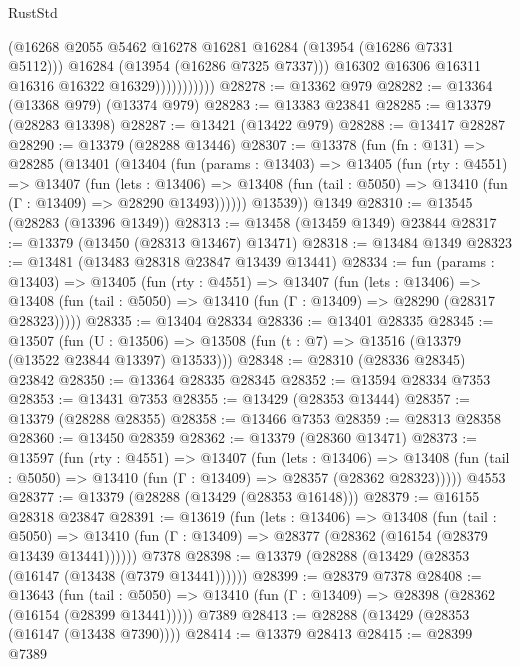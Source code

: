 \begin{lexlean}{RustStd}
\begin{coremodule}
                            (@16268 @2055 @5462 @16278 @16281 @16284 (@13954 (@16286 @7331 @5112)))
                            @16284
                            (@13954 (@16286 @7325 @7337)))
                          @16302
                          @16306
                          @16311
                          @16316
                          @16322
                          @16329)))))))))))
@28278 := @13362 @979
@28282 := @13364 (@13368 @979) (@13374 @979)
@28283 := @13383 @23841
@28285 := @13379 (@28283 @13398)
@28287 := @13421 (@13422 @979)
@28288 := @13417 @28287
@28290 := @13379 (@28288 @13446)
@28307 := @13378
    (fun (fn : @131) =>
    @28285
      (@13401
        (@13404
          (fun (params : @13403) =>
          @13405
            (fun (rty : @4551) =>
            @13407
              (fun (lets : @13406) =>
              @13408 (fun (tail : @5050) => @13410 (fun (Γ : @13409) => @28290 @13493))))))
        @13539))
    @1349
@28310 := @13545 (@28283 (@13396 @1349))
@28313 := @13458 (@13459 @1349) @23844
@28317 := @13379 (@13450 (@28313 @13467) @13471)
@28318 := @13484 @1349
@28323 := @13481 (@13483 @28318 @23847 @13439 @13441)
@28334 := fun (params : @13403) =>
  @13405
    (fun (rty : @4551) =>
    @13407
      (fun (lets : @13406) =>
      @13408 (fun (tail : @5050) => @13410 (fun (Γ : @13409) => @28290 (@28317 @28323)))))
@28335 := @13404 @28334
@28336 := @13401 @28335
@28345 := @13507
    (fun (U : @13506) => @13508 (fun (t : @7) => @13516 (@13379 (@13522 @23844 @13397) @13533)))
@28348 := @28310 (@28336 @28345) @23842
@28350 := @13364 @28335 @28345
@28352 := @13594 @28334 @7353
@28353 := @13431 @7353
@28355 := @13429 (@28353 @13444)
@28357 := @13379 (@28288 @28355)
@28358 := @13466 @7353
@28359 := @28313 @28358
@28360 := @13450 @28359
@28362 := @13379 (@28360 @13471)
@28373 := @13597
    (fun (rty : @4551) =>
    @13407
      (fun (lets : @13406) =>
      @13408 (fun (tail : @5050) => @13410 (fun (Γ : @13409) => @28357 (@28362 @28323)))))
    @4553
@28377 := @13379 (@28288 (@13429 (@28353 @16148)))
@28379 := @16155 @28318 @23847
@28391 := @13619
    (fun (lets : @13406) =>
    @13408
      (fun (tail : @5050) =>
      @13410 (fun (Γ : @13409) => @28377 (@28362 (@16154 (@28379 @13439 @13441))))))
    @7378
@28398 := @13379 (@28288 (@13429 (@28353 (@16147 (@13438 (@7379 @13441))))))
@28399 := @28379 @7378
@28408 := @13643
    (fun (tail : @5050) => @13410 (fun (Γ : @13409) => @28398 (@28362 (@16154 (@28399 @13441)))))
    @7389
@28413 := @28288 (@13429 (@28353 (@16147 (@13438 @7390))))
@28414 := @13379 @28413
@28415 := @28399 @7389

\end{coremodule}
\end{lexlean}
